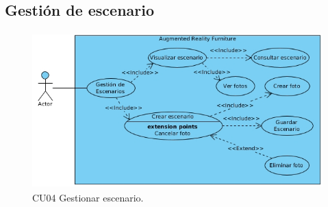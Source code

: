 \subsection{Gestión de escenario} 
\vspace{5mm}
\begin{figure}[h!]
	\centering
	\includegraphics[width=12cm,height=6cm]{imagenes/analisis/gestionEscenarios.jpg}
	\caption{CU04 Gestionar escenario.}
	\label{fig:analogo}
\end{figure}
